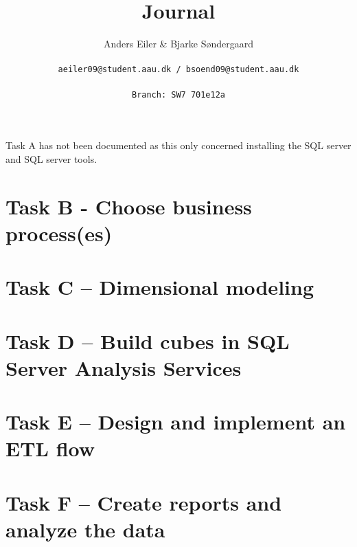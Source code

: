 \documentclass[a4paper,10pt]{article}
\title{Journal}
\author{Anders Eiler \& Bjarke Søndergaard \\
\rule{0pt}{4ex}\texttt{aeiler09@student.aau.dk / bsoend09@student.aau.dk} \\
\rule{0pt}{4ex}\texttt{Branch: SW7 701e12a}}
\begin{document}
    \maketitle
    \newpage
    
    Task A has not been documented as this only concerned installing the SQL server and SQL server tools.

    \section{Task B - Choose business process(es)}
    
    
    \section{Task C – Dimensional modeling}
    

    \section{Task D – Build cubes in SQL Server Analysis Services}
    

    \section{Task E – Design and implement an ETL flow}
    

    \section{Task F – Create reports and analyze the data}
    
\end{document}
